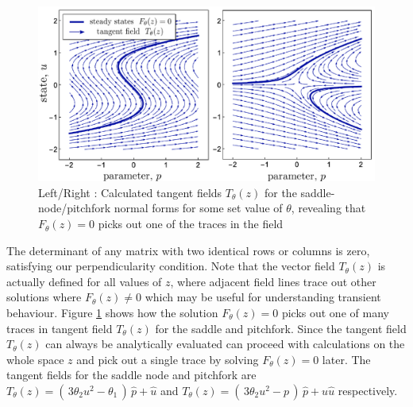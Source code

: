 \documentclass{article}[12pt]
\numberwithin{equation}{section}
\begin{document}
\begin{figure}[H]
\centering{}
\captionsetup{justification=centering}
\includegraphics[width=14cm]{docs/figures/tangent-field}
\caption{Left/Right : Calculated tangent fields $T_{\theta}(z)$ for the saddle-node/pitchfork normal forms for some set value of $\theta$, revealing that $F_{\theta}(z)=0$ picks out one of the traces in the field}
\label{fig:tangent-field}
\end{figure}
The determinant of any matrix with two identical rows or columns is zero, satisfying our perpendicularity condition. Note that the vector field $T_{\theta}(z)$ is actually defined for all values of $z$, where adjacent field lines trace out other solutions where $F_{\theta}(z)\neq0$ which may be useful for understanding transient behaviour. Figure \ref{fig:tangent-field} shows how the solution $F_{\theta}(z)=0$ picks out one of many traces in tangent field $T_{\theta}(z)$ for the saddle and pitchfork. Since the tangent field $T_{\theta}(z)$ can always be analytically evaluated can proceed with calculations on the whole space $z$ and pick out a single trace by solving $F_{\theta}(z)=0$ later. The tangent fields for the saddle node and pitchfork are $T_{\theta}(z)=(\,3\theta_2 u^2-\theta_1\,)\,\hat{p}+\hat{u}$ and $T_{\theta}(z)=(\,3\theta_2 u^2-p\,)\,\hat{p}+u\hat{u}$ respectively.
\end{document}
